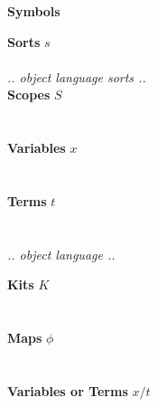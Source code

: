 \documentclass[screen,nonacm]{acmart}
\begin{document}
\begin{figure}[t]
      \centering
      \small
      {\raggedright \textbf{\Large Symbols} \par}
      \vspace{1.5em}

      \begin{minipage}[t]{0.48\textwidth}
            \raggedright{}
            \textbf{Sorts} $s$ \\
            \ESortTy{}\\
            \vspace{0.5em}
            \emph{.. object language sorts ..}\\
            \vspace{0.5em}
            \textbf{Scopes} $S$ \\
            \EScopeDefTy{}\\
            \vspace{0.5em}
            \EScopeDef{}\\
            \vspace{0.5em}
            \textbf{Variables} $x$ \\
            \EVarsTy{}\\
            \vspace{0.5em}
            \EVars{}\\
            \vspace{0.5em}
            \textbf{Terms} $t$ \\
            \ETmC{}\\
            \vspace{0.5em}
            \EVarC{}\\
            \emph{.. object language  ..}\\
            \vspace{1.0em}
      \end{minipage}
      \hfill
      \begin{minipage}[t]{0.48\textwidth}
            \raggedright{}
            \textbf{Kits} $K$ \\
            \EKitDefTy{}\\
            \vspace{0.5em}
            \EKitDef{}\\
            \vspace{0.5em}
            \textbf{Maps} $ϕ$\\
            \EPrimsTy{}\\
            \vspace{0.5em}
            \EPrims{}\\
            \vspace{0.5em}
            \textbf{Variables or Terms} $x/t$\\
            \EVarTrmTy{}\\
            \vspace{0.5em}
            \EVarTrmApp{}
      \end{minipage}


\end{figure}
\end{document}
